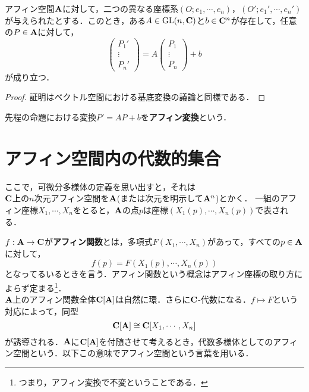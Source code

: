 \documentclass{myclass}
\begin{document}
\begin{proposition}
  アフィン空間$\mathbf{A}$に対して，二つの異なる座標系$(O;e_1,\cdots,e_n)$，$(O';e_1',\cdots,e_n')$が与えられたとする．このとき，ある$A\in \mathrm{GL}(n,\mathbf{C})$と$b\in \mathbf{C}^n$が存在して，任意の$P\in \mathbf{A}$に対して，
  \begin{equation*}
    \begin{pmatrix}
      P_1' \\ \vdots \\ P_n'
    \end{pmatrix}
    =
    A
    \begin{pmatrix}
      P_1 \\ \vdots \\ P_n
    \end{pmatrix}
    +
    b
  \end{equation*}
  が成り立つ．
\end{proposition}

\begin{proof}
  証明はベクトル空間における基底変換の議論と同様である．
\end{proof}

\begin{definition}
  先程の命題における変換$P' = AP + b$を\textbf{アフィン変換}という．
\end{definition}



\section{アフィン空間内の代数的集合}
ここで，可微分多様体の定義を思い出すと，それは\\

$\mathbf{C}$上の$n$次元アフィン空間を$\mathbf{A}$(または次元を明示して$\mathbf{A}^n$)とかく．
一組のアフィン座標$X_1,\cdots,X_n$をとると，$\mathbf{A}$の点$p$は座標$(X_1(p),\cdots,X_n(p))$で表される．
\begin{definition}
  $f:\mathbf{A} \to \mathbf{C}$が\textbf{アフィン関数}とは，多項式$F(X_1,\cdots,X_n)$があって，すべての$p\in \mathbf{A}$に対して，
  \begin{equation*}
    f(p) = F(X_1(p),\cdots,X_n(p))
  \end{equation*}
  となってるいるときを言う．アフィン関数という概念はアフィン座標の取り方によらず定まる\footnote{つまり，アフィン変換で不変ということである．}．\\
  $\mathbf{A}$上のアフィン関数全体$\mathbf{C}[\mathbf{A}]$は自然に環．さらに$\mathbf{C}$-代数になる．$f\mapsto F$という対応によって，同型
  \begin{equation*}
    \mathbf{C}[\mathbf{A}] \cong \mathbf{C}[X_1,\cdots,X_n]
  \end{equation*}
  が誘導される．$\mathbf{A}$に$\mathbf{C}[\mathbf{A}]$を付随させて考えるとき，代数多様体としてのアフィン空間という．以下この意味でアフィン空間という言葉を用いる．
\end{definition}
\end{document}
